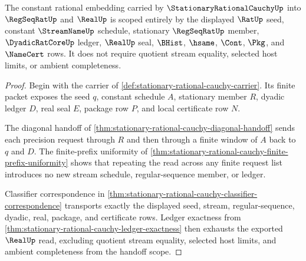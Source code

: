 \begin{theorem}
\label{thm:stationary-rational-cauchy-regseqrat-handoff-scope}
The constant rational embedding carried by $\StationaryRationalCauchyUp$ into $\RegSeqRatUp$ and $\RealUp$ is scoped entirely by the displayed $\RatUp$ seed, constant $\StreamNameUp$ schedule, stationary $\RegSeqRatUp$ member, $\DyadicRatCoreUp$ ledger, $\RealUp$ seal, $\BHist$, $\hsame$, $\Cont$, $\Pkg$, and $\NameCert$ rows. It does not require quotient stream equality, selected host limits, or ambient completeness.
\end{theorem}
\begin{proof}
Begin with the carrier of \autoref{def:stationary-rational-cauchy-carrier}. Its finite packet exposes the seed $q$, constant schedule $A$, stationary member $R$, dyadic ledger $D$, real seal $E$, package row $P$, and local certificate row $N$.

The diagonal handoff of \autoref{thm:stationary-rational-cauchy-diagonal-handoff} sends each precision request through $R$ and then through a finite window of $A$ back to $q$ and $D$. The finite-prefix uniformity of \autoref{thm:stationary-rational-cauchy-finite-prefix-uniformity} shows that repeating the read across any finite request list introduces no new stream schedule, regular-sequence member, or ledger.

Classifier correspondence in \autoref{thm:stationary-rational-cauchy-classifier-correspondence} transports exactly the displayed seed, stream, regular-sequence, dyadic, real, package, and certificate rows. Ledger exactness from \autoref{thm:stationary-rational-cauchy-ledger-exactness} then exhausts the exported $\RealUp$ read, excluding quotient stream equality, selected host limits, and ambient completeness from the handoff scope.
\end{proof}

